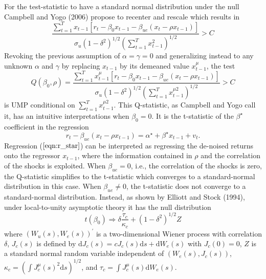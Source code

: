 \documentclass{article}
\begin{document}
For the test-statistic to have a standard normal distribution under the null Campbell and Yogo (2006) propose to recenter and rescale which results in 
\begin{equation}
\frac{\sum_{t=1}^{T} x_{t-1}\left[r_{t}-\beta_{0} x_{t-1}-\beta_{u e}\left(x_{t}-\rho x_{t-1}\right)\right]}{\sigma_{u}\left(1-\delta^{2}\right)^{1 / 2}\left(\sum_{t=1}^{T} x_{t-1}^{2}\right)^{1 / 2}}>C
\end{equation}
Revoking the previous assumption of $\alpha=\gamma=0$ and generalizing instead to any unknown  $\alpha$ and $\gamma$ by replacing $x_{t-1}$ by its demeaned value $x_{t-1}^{\mu}$, the test
\begin{equation}
Q\left(\beta_{0}, \rho\right)=\frac{\sum_{t=1}^{T} x_{t-1}^{\mu}\left[r_{t}-\beta_{0} x_{t-1}-\beta_{u e}\left(x_{t}-\rho x_{t-1}\right)\right]}{\sigma_{u}\left(1-\delta^{2}\right)^{1 / 2}\left(\sum_{t=1}^{T} x_{t-1}^{\mu 2}\right)^{1 / 2}}>C
\end{equation}
is UMP conditional on $\sum_{t=1}^{T} x_{t-1}^{\mu 2}$.
This Q-statistic, as Campbell and Yogo call it, has an intuitive interpretations when $\beta_{0} = 0$. It is the t-statistic of the $\beta^{\star}$ coefficient in the regression
 \begin{equation}
 \label{eqn:r_star}
r_{t}-\beta_{u e}\left(x_{t}-\rho x_{t-1}\right)=\alpha^{\star}+\beta^{\star} x_{t-1}+v_{t}. 
\end{equation}
Regression ($\ref{eqn:r_star}$) can be interpreted as regressing the de-noised returns onto the regressor $x_{t-1}$, where the information contained in $\rho$ and the correlation of the shocks is exploited.
When $\beta_{u e}=0$, i.e., the correlation of the shocks is zero, the Q-statistic simplifies to the t-statistic which converges to a standard-normal distribution in this case. When $\beta_{u e}\neq0$, the t-statistic does not converge to a standard-normal distribution. Instead, as shown by Elliott and Stock (1994), under local-to-unity asymptotic theory it has the null distribution 
\begin{equation}
t\left(\beta_{0}\right) \Rightarrow \delta \frac{\tau_{c}}{\kappa_{c}}+\left(1-\delta^{2}\right)^{1 / 2} Z
\end{equation}
where $\left(W_{u}(s), W_{e}(s)\right)^{\prime}$ is a two-dimensional Wiener process with correlation $\delta$, $J_{c}(s)$ is defined by $\mathrm{d} J_{c}(s)=c J_{c}(s) \mathrm{d} s+\mathrm{d} W_{e}(s)$ with $J_{c}(0)=0$, $Z$ is a standard normal random variable independent of $\left(W_{e}(s), J_{c}(s)\right)$, $\kappa_{c}=\left(\int J_{c}^{\mu}(s)^{2} \mathrm{d} s\right)^{1 / 2}$, and $\tau_{c}=\int J_{c}^{\mu}(s) \mathrm{d} W_{e}(s)$.
\end{document}
